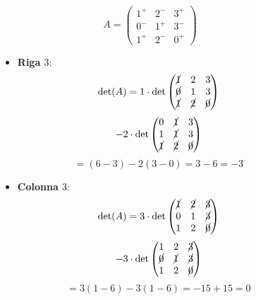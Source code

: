 \documentclass[a4paper]{article}
\theoremstyle{break}
\theoremstyle{break}
\theoremstyle{break}
\theoremstyle{break}
\begin{document}
\begin{figure}[H]
  \begin{example}
    \[
    A = \begin{pmatrix} 
      1^+ & 2^- & 3^+\\
      0^- & 1^+ & 3^-\\
      1^+ & 2^- & 0^+
    \end{pmatrix} 
    \] 
    \begin{itemize}
      \item \textbf{Riga \( 3 \)}:
        \[
        \det(A) = 1 \cdot \det\begin{pmatrix} 
          \cancel{1} & 2 & 3\\
          \cancel{0} & 1 & 3\\
          \cancel{1} & \cancel{2} & \cancel{0}
        \end{pmatrix}
        \] 
        \[
        - 2 \cdot \det\begin{pmatrix} 
          0 & \cancel{1} & 3\\
          1 & \cancel{1} & 3\\
          \cancel{1} & \cancel{2} & \cancel{0}
        \end{pmatrix}
        \] 
        \[
        = (6 - 3) - 2(3-0) = 3-6 = -3
        \] 
      \item \textbf{Colonna \( 3 \)}:
        \[
        \det(A) = 3 \cdot \det\begin{pmatrix} 
          \cancel{1} & \cancel{2} & \cancel{3}\\
          0 & 1 & \cancel{3}\\
          1 & 2 & \cancel{0}
        \end{pmatrix}
        \] 
        \[
        - 3 \cdot \det\begin{pmatrix} 
          1 & 2 & \cancel{3}\\
          \cancel{0} & \cancel{1} & \cancel{3}\\
          1 & 2 & \cancel{0}
        \end{pmatrix}
        \] 
        \[
        = 3(1-6) - 3(1-6) = -15 + 15 = 0
        \]
    \end{itemize}
  \end{example}
\end{figure}
\end{document}
